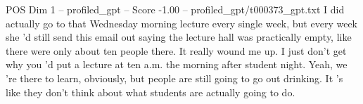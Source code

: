 \begin{textsample}{POS Dim 1 – profiled\_gpt – Score -1.00 – profiled\_gpt/t000373\_gpt.txt}  \label{ex:f1_pos_036}
I did actually go to that Wednesday morning lecture every single week, but every week she ’d still send this email out saying the lecture hall was practically empty, like there were only about ten people there.
It really wound me up.
I just don't get why you ’d put a lecture at ten a.m. the morning after student night.
Yeah, we ’re there to learn, obviously, but people are still going to go out drinking.
It ’s like they don't think about what students are actually going to do.

\end{textsample}
